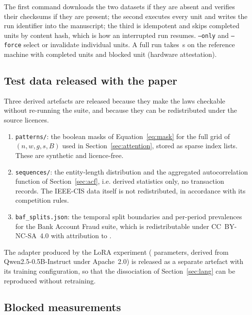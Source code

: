 The first command downloads the two datasets if they are absent and verifies their
checksums if they are present; the second executes every unit and writes the run
identifier into the manuscript; the third is idempotent and skips completed units
by content hash, which is how an interrupted run resumes. \texttt{--only} and
\texttt{--force} select or invalidate individual units. A full run takes
\RunElapsed\,s on the reference machine with \RunUnits{} completed units and
\RunBlocked{} blocked unit (hardware attestation).

\subsection*{Test data released with the paper}

Three derived artefacts are released because they make the laws checkable without
re-running the suite, and because they can be redistributed under the source
licences.

\begin{enumerate}\itemsep2pt
\item \texttt{patterns/}: the boolean masks of Equation~\eqref{eq:mask} for the
full grid of $(n,w,g,s,B)$ used in Section~\ref{sec:attention}, stored as sparse
index lists. These are synthetic and licence-free.
\item \texttt{sequences/}: the entity-length distribution and the aggregated
autocorrelation function of Section~\ref{sec:acf}, i.e. derived statistics only, no
transaction records. The IEEE-CIS data itself is not redistributed, in accordance
with its competition rules.
\item \texttt{baf\_splits.json}: the temporal split boundaries and per-period
prevalences for the Bank Account Fraud suite, which is redistributable under
CC~BY-NC-SA~4.0 with attribution to \cite{jesus2022turning}.
\end{enumerate}

The adapter produced by the LoRA experiment (\SftTrainable{} parameters, derived
from Qwen2.5-0.5B-Instruct under Apache~2.0) is released as a separate artefact
with its training configuration, so that the dissociation of
Section~\ref{sec:lang} can be reproduced without retraining.

\subsection*{Blocked measurements}

